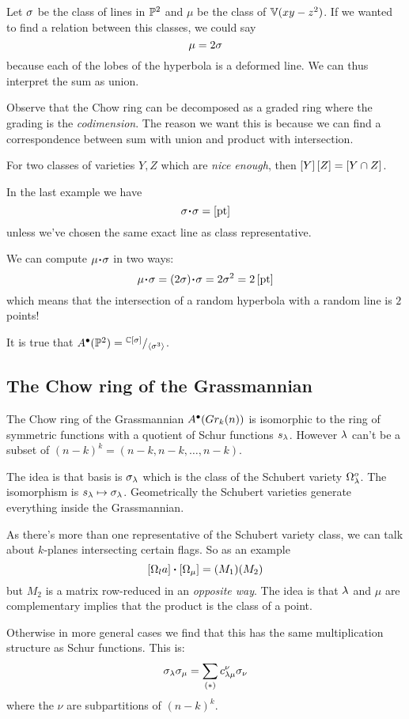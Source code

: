 \documentclass[12pt]{memoir}
\begin{document}
\begin{Ex}
    Let $\sigma$ be the class of lines in $\mathbb{P}^2$ and $\mu$ be the class of $\mathbb{V}(xy-z^2)$. If we wanted to find a relation between this classes, we could say 
    $$\mu=2\sigma$$
    because each of the lobes of the hyperbola is a deformed line. We can thus interpret the sum as union.
\end{Ex}

Observe that the Chow ring can be decomposed as a graded ring where the grading is the \emph{codimension}. The reason we want this is because we can find a correspondence between sum with union and product with intersection.\par 
For two classes of varieties $Y,Z$ which are \emph{nice enough}, then $\left\lbrack Y\right\rbrack\left\lbrack Z\right\rbrack=\left\lbrack Y\cap Z\right\rbrack$. 

\begin{Ex}
    In the last example we have 
    $$\sg\.\sg=\bonj{\text{pt}}$$
    unless we've chosen the same exact line as class representative.\par 
    We can compute $\mu\.\sg$ in two ways:
    $$\mu\.\sg=(2\sg)\.\sg=2\sg^2=2\bonj{\text{pt}}$$
    which means that the intersection of a random hyperbola with a random line is $2$ points!
\end{Ex}

\begin{Ej}
    It is true that $A^\8(\bP^2)=\quot{\bC[\sg]}{\genr{\sg^3}}$.
\end{Ej}

\subsection{The Chow ring of the Grassmannian}

\begin{Th}
    The Chow ring of the Grassmannian $A^\bullet(Gr_k(n))$ is isomorphic to the ring of symmetric functions with a quotient of Schur functions $s_\lambda$. However $\lambda$ can't be a subset of $(n-k)^k=(n-k,n-k,\dots,n-k)$.
\end{Th}

The idea is that basis is $\sigma_\lambda$ which is the class of the Schubert variety $\Omega_\lambda^o$. The isomorphism is $s_\lambda\mapsto\sigma_\lambda$. Geometrically the Schubert varieties generate everything inside the Grassmannian.\par 
As there's more than one representative of the Schubert variety class, we can talk about $k$-planes intersecting certain flags. So as an example 
$$\bonj{\Om_la}\.\bonj{\Om_\mu}=(M_1)(M_2)$$
but $M_2$ is a matrix row-reduced in an \emph{opposite way}. The idea is that $\lambda$ and $\mu$ are complementary implies that the product is the class of a point.\par 
Otherwise in more general cases we find that this has the same multiplication structure as Schur functions. This is:
$$\sigma_\lambda\sigma_\mu=\sum_{(\ast)}c_{\lambda\mu}^\nu\sigma_\nu$$
where the $\nu$ are subpartitions of $(n-k)^k$.
\end{document}
